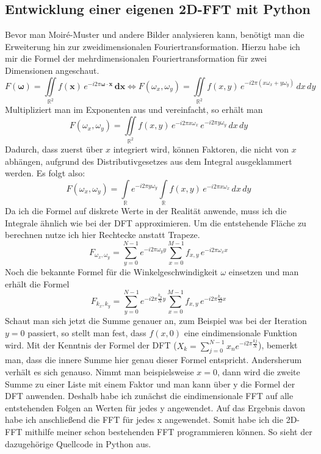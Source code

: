\documentclass[a4paper,12pt]{article}
\theoremstyle{definition}
\theoremstyle{remark}
\begin{document}
\subsection{Entwicklung einer eigenen 2D-FFT mit Python}
Bevor man Moiré-Muster und andere Bilder analysieren kann, benötigt man die Erweiterung hin zur zweidimensionalen Fouriertransformation. Hierzu 
habe ich mir die Formel der mehrdimensionalen Fouriertransformation für zwei Dimensionen angeschaut. 
\[
F(\mathbf{\omega}) = \iint\limits_{\mathbb{R}^2} f(\mathbf{x}) \, e^{-i2\pi \mathbf{\omega} \cdot \mathbf{x}} \,\mathbf{dx}
\Leftrightarrow F(\omega_x, \omega_y) = \iint\limits_{\mathbb{R}^2} f(x, y) \, e^{-i2\pi (x \omega_x + y \omega_y)} \, dx \, dy
\]
Multipliziert man im Exponenten aus und vereinfacht, so erhält man 
\[
F(\omega_x, \omega_y) = \iint\limits_{\mathbb{R}^2} f(x, y) \, e^{-i2\pi x \omega_x} \, e^{-i2\pi y \omega_y} \, dx \, dy
\]
Dadurch, dass zuerst über $x$ integriert wird, können Faktoren, die nicht von $x$ abhängen, aufgrund des Distributivgesetzes aus dem Integral ausgeklammert werden. Es folgt also:
\[
F(\omega_x, \omega_y) = \int\limits_{\mathbb{R}} e^{-i2\pi y \omega_y} \int\limits_{\mathbb{R}} f(x, y) \, e^{-i2\pi x \omega_x} \, dx \, dy
\]
Da ich die Formel auf diskrete Werte in der Realität anwende, muss ich die Integrale ähnlich wie bei der DFT approximieren. Um die entstehende Fläche zu 
berechnen nutze ich hier Rechtecke anstatt Trapeze.
\[
F_{\omega_x, \omega_y} = \sum_{y=0}^{N-1} {e^{-i2\pi \omega_y y} \sum_{x=0}^{M-1}{f_{x, y} \, e^{-i2\pi \omega_x x}}} 
\]
Noch die bekannte Formel für die Winkelgeschwindigkeit $\omega$ einsetzen und man erhält die Formel 
\[
F_{k_x, k_y} = \sum_{y=0}^{N-1} {e^{-i2\pi \frac{k_y}{N} y} \sum_{x=0}^{M-1}{f_{x, y} \, e^{-i2\pi \frac{k_x}{M} x}}}
\]
Schaut man sich jetzt die Summe genauer an, zum Beispiel was bei der Iteration $y=0$ passiert, so stellt man fest, dass $f(x,0)$ eine eindimensionale Funktion 
wird. Mit der Kenntnis der Formel der DFT ($X_k = \sum_{j = 0}^{N-1}{x_n e^{-i2\pi \frac{kj}{N}}}$), bemerkt man, dass die innere Summe hier genau dieser Formel 
entspricht. Andersherum verhält es sich genauso. Nimmt man beispielsweise $x=0$, dann wird die zweite Summe zu einer Liste mit einem Faktor und man kann über y 
die Formel der DFT anwenden. Deshalb habe ich zunächst die eindimensionale FFT auf alle entstehenden Folgen an Werten für jedes y angewendet. Auf das Ergebnis 
davon habe ich anschließend die FFT für jedes x angewendet. Somit habe ich die 2D-FFT mithilfe meiner schon bestehenden FFT programmieren können. So sieht 
der dazugehörige Quellcode in Python aus.
\end{document}
